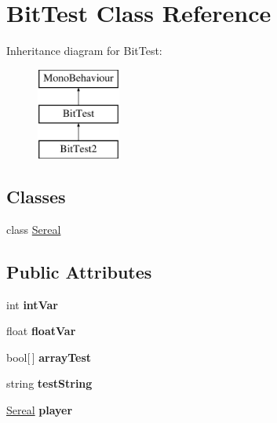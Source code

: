 \hypertarget{class_bit_test}{\section{Bit\-Test Class Reference}
\label{class_bit_test}
}
Inheritance diagram for Bit\-Test\-:\begin{figure}[H]
\begin{center}
\leavevmode
\includegraphics[height=3.000000cm]{class_bit_test}
\end{center}
\end{figure}
\subsection*{Classes}
\begin{DoxyCompactItemize}
\item 
class \hyperlink{class_bit_test_1_1_sereal}{Sereal}
\end{DoxyCompactItemize}
\subsection*{Public Attributes}
\begin{DoxyCompactItemize}
\item 
\hypertarget{class_bit_test_a229c089c4bf0f320defa8af85362ca97}{int {\bfseries int\-Var}}\label{class_bit_test_a229c089c4bf0f320defa8af85362ca97}

\item 
\hypertarget{class_bit_test_aff8f50b12ea462699b258dd4fe7da1e7}{float {\bfseries float\-Var}}\label{class_bit_test_aff8f50b12ea462699b258dd4fe7da1e7}

\item 
\hypertarget{class_bit_test_a92242e855e7f4507b804a77ae6221166}{bool\mbox{[}$\,$\mbox{]} {\bfseries array\-Test}}\label{class_bit_test_a92242e855e7f4507b804a77ae6221166}

\item 
\hypertarget{class_bit_test_afca10f624e8a1ad35b1272da122f5884}{string {\bfseries test\-String}}\label{class_bit_test_afca10f624e8a1ad35b1272da122f5884}

\item 
\hypertarget{class_bit_test_a8199bf47d16d38ff7a9fc8b7f637c419}{\hyperlink{class_bit_test_1_1_sereal}{Sereal} {\bfseries player}}\label{class_bit_test_a8199bf47d16d38ff7a9fc8b7f637c419}

\end{DoxyCompactItemize}
